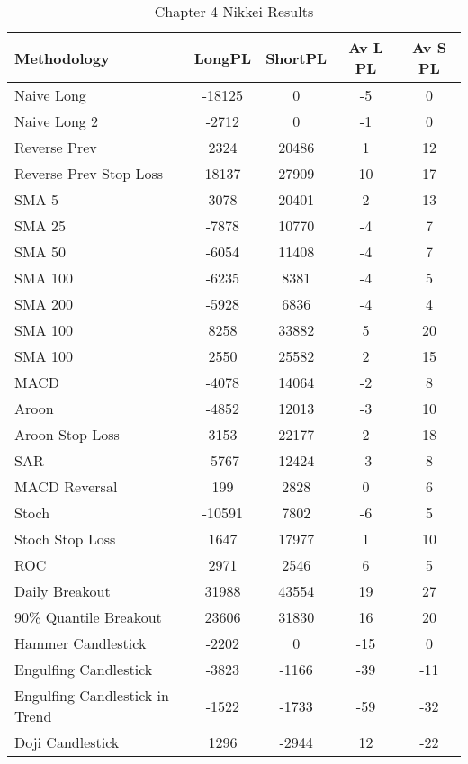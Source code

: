 \begin{table}[ht]
\centering
\caption[Chapter 4 Nikkei Results]{Chapter 4 Nikkei Results} 
\label{tab:chp6:nik_summary}
\begin{tabular}{lcccc}
  \toprule Methodology & LongPL & ShortPL & Av L PL & Av S PL \\ 
  \midrule Naive Long & -18125 & 0 & -5 & 0 \\ 
  Naive Long 2 & -2712 & 0 & -1 & 0 \\ 
  Reverse Prev & 2324 & 20486 & 1 & 12 \\ 
  Reverse Prev Stop Loss & 18137 & 27909 & 10 & 17 \\ 
  SMA 5 & 3078 & 20401 & 2 & 13 \\ 
  SMA 25 & -7878 & 10770 & -4 & 7 \\ 
  SMA 50 & -6054 & 11408 & -4 & 7 \\ 
  SMA 100 & -6235 & 8381 & -4 & 5 \\ 
  SMA 200 & -5928 & 6836 & -4 & 4 \\ 
  SMA 100 & 8258 & 33882 & 5 & 20 \\ 
  SMA 100 & 2550 & 25582 & 2 & 15 \\ 
  MACD & -4078 & 14064 & -2 & 8 \\ 
  Aroon & -4852 & 12013 & -3 & 10 \\ 
  Aroon Stop Loss & 3153 & 22177 & 2 & 18 \\ 
  SAR & -5767 & 12424 & -3 & 8 \\ 
  MACD Reversal & 199 & 2828 & 0 & 6 \\ 
  Stoch & -10591 & 7802 & -6 & 5 \\ 
  Stoch Stop Loss & 1647 & 17977 & 1 & 10 \\ 
  ROC & 2971 & 2546 & 6 & 5 \\ 
  Daily Breakout & 31988 & 43554 & 19 & 27 \\ 
  90\% Quantile Breakout & 23606 & 31830 & 16 & 20 \\ 
  Hammer Candlestick & -2202 & 0 & -15 & 0 \\ 
  Engulfing Candlestick & -3823 & -1166 & -39 & -11 \\ 
  Engulfing Candlestick in Trend & -1522 & -1733 & -59 & -32 \\ 
  Doji Candlestick & 1296 & -2944 & 12 & -22 \\ 
   \bottomrule \end{tabular}
\end{table}
